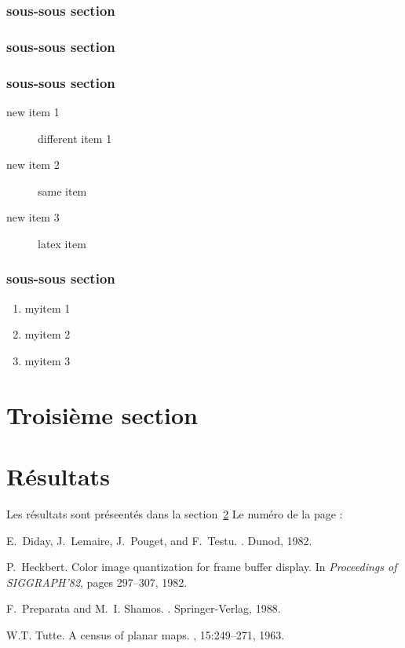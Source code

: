 \documentclass{article}
\begin{document}
\subsubsection{sous-sous section}
\subsubsection{sous-sous section}
\subsubsection{sous-sous section}

\begin{description}
\item [new item 1] different item 1
\item [new item 2] same item
\item [new item 3] latex item
\end{description}
\subsubsection{sous-sous section}

\begin{enumerate}
\item myitem 1
\item myitem 2
\item myitem 3
\end{enumerate}
\section{Troisième section}

\section{Résultats}
\label{resultats}
Les résultats sont préseentés dans la section~\ref{resultats}
Le numéro de la page : \pageref{resultat}
\tableofcontents
\begin{thebibliography}{1}

E.~Diday, J.~Lemaire, J.~Pouget, and F.~Testu.
.
\newblock Dunod, 1982.

P.~Heckbert.
\newblock Color image quantization for frame buffer display.
\newblock In {\em Proceedings of SIGGRAPH'82}, pages 297--307, 1982.

F.~Preparata and M.~I. Shamos.
.
\newblock Springer-Verlag, 1988.

W.T. Tutte.
\newblock A census of planar maps.
, 15:249--271, 1963.

\end{thebibliography}
\end{document}
